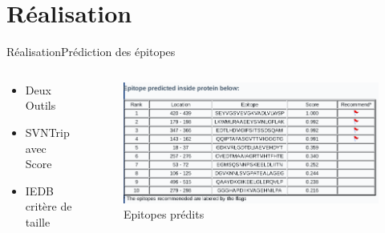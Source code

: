 \documentclass{PresentationHEIGVD}
\begin{document}
\section{Réalisation}
\begin{frame}{Réalisation}{Prédiction des épitopes}
\begin{columns}[c]
	\begin{column}[c]{5cm}
		\begin{itemize}[<+->]
			\item Deux Outils
			\item SVNTrip avec Score
			\item IEDB critère de taille
		\end{itemize}
	\end{column}
	\begin{column}[c]{5cm}
		\begin{figure}
		\includegraphics[width=\textwidth]{img/pred.png}
		\caption{Epitopes prédits}
		\end{figure}
	\end{column}
\end{columns}

\end{frame}
\end{document}
